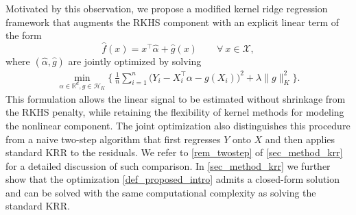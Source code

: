 \documentclass[11pt,twoside]{article}
\def\RR{\mathbb{R}}
\def\cH{\mathcal H}
\def\cX{\mathcal{X}}
\def\wh{\widehat}
\def\T{\top}
\def\B{\Big}
\begin{document}
Motivated by this observation, we propose a modified kernel ridge regression framework that augments the RKHS component with an explicit linear term of the form
\begin{equation}\label{def_f_hat_intro}
\wh f(x) = x^\T \wh \alpha + \wh g(x)\qquad \forall ~ x\in \cX,
\end{equation}
where  $(\wh \alpha, \wh g)$ are jointly optimized by solving 
\begin{align}\label{def_proposed_intro}
     \min_{\alpha\in \RR^d,  g\in \cH_K}   \B\{~  \frac{1}{n} \sum_{i=1}^n\bigl(Y_i- X_i ^\T  \alpha - g(X_i)\bigl)^2 +\lambda\|g\|_K ^2 \B\}.
\end{align}
This formulation allows the linear signal to be estimated without shrinkage from the RKHS penalty, while retaining the flexibility of kernel methods for modeling the nonlinear component. The joint optimization also distinguishes this procedure from a naive two-step algorithm that first regresses $Y$ onto $X$ and then applies standard KRR to the residuals. We refer to \cref{rem_twostep} of \cref{sec_method_krr} for a detailed discussion of such comparison.
In \cref{sec_method_krr} we further show that the optimization \eqref{def_proposed_intro} admits a closed-form solution and can be solved with the same computational complexity as solving the standard KRR.
\end{document}
